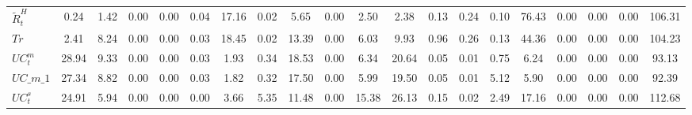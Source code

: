 \begin{center}
\begin{longtable}{lccccccccccccccccccc}
$  \tilde{R}^H_t            $	 & 	                0.24	 & 	                1.42	 & 	                0.00	 & 	                0.00	 & 	                0.04	 & 	               17.16	 & 	                0.02	 & 	                5.65	 & 	                0.00	 & 	                2.50	 & 	                2.38	 & 	                0.13	 & 	                0.24	 & 	                0.10	 & 	               76.43	 & 	                0.00	 & 	                0.00	 & 	                0.00	 & 	              106.31 \\ 
$ Tr                        $	 & 	                2.41	 & 	                8.24	 & 	                0.00	 & 	                0.00	 & 	                0.03	 & 	               18.45	 & 	                0.02	 & 	               13.39	 & 	                0.00	 & 	                6.03	 & 	                9.93	 & 	                0.96	 & 	                0.26	 & 	                0.13	 & 	               44.36	 & 	                0.00	 & 	                0.00	 & 	                0.00	 & 	              104.23 \\ 
$ UC^m_t                    $	 & 	               28.94	 & 	                9.33	 & 	                0.00	 & 	                0.00	 & 	                0.03	 & 	                1.93	 & 	                0.34	 & 	               18.53	 & 	                0.00	 & 	                6.34	 & 	               20.64	 & 	                0.05	 & 	                0.01	 & 	                0.75	 & 	                6.24	 & 	                0.00	 & 	                0.00	 & 	                0.00	 & 	               93.13 \\ 
$UC\_m\_1                   $	 & 	               27.34	 & 	                8.82	 & 	                0.00	 & 	                0.00	 & 	                0.03	 & 	                1.82	 & 	                0.32	 & 	               17.50	 & 	                0.00	 & 	                5.99	 & 	               19.50	 & 	                0.05	 & 	                0.01	 & 	                5.12	 & 	                5.90	 & 	                0.00	 & 	                0.00	 & 	                0.00	 & 	               92.39 \\ 
$ UC^s_t                    $	 & 	               24.91	 & 	                5.94	 & 	                0.00	 & 	                0.00	 & 	                0.00	 & 	                3.66	 & 	                5.35	 & 	               11.48	 & 	                0.00	 & 	               15.38	 & 	               26.13	 & 	                0.15	 & 	                0.02	 & 	                2.49	 & 	               17.16	 & 	                0.00	 & 	                0.00	 & 	                0.00	 & 	              112.68 \\ 

\end{longtable}
\end{center}
